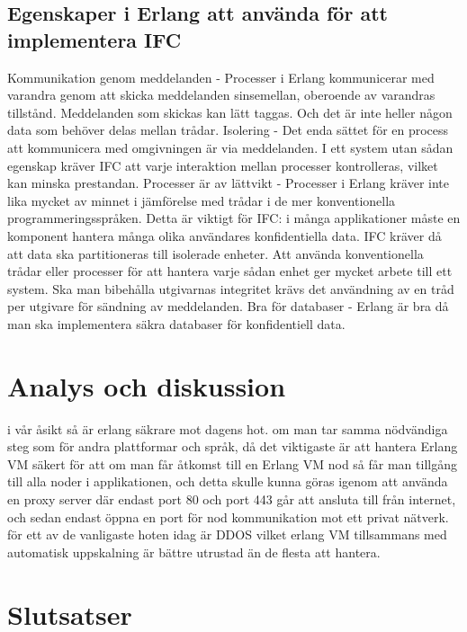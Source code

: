 \documentclass[12pt]{article}
\begin{document}
\subsection*{Egenskaper i Erlang att använda för att implementera IFC} 
Kommunikation genom meddelanden - Processer i Erlang kommunicerar med varandra genom att skicka meddelanden sinsemellan, oberoende av varandras tillstånd. Meddelanden som skickas kan lätt taggas. Och det är inte heller någon data som behöver delas mellan trådar. 
Isolering - Det enda sättet för en process att kommunicera med omgivningen är via meddelanden. I ett system utan sådan egenskap kräver IFC att varje interaktion mellan processer kontrolleras, vilket kan minska prestandan. 
Processer är av lättvikt - Processer i Erlang kräver inte lika mycket av minnet i jämförelse med trådar i de mer konventionella programmeringsspråken. Detta är viktigt för IFC: i många applikationer måste en komponent hantera många olika användares konfidentiella data. IFC kräver då att data ska partitioneras till isolerade enheter. Att använda konventionella trådar eller processer för att hantera varje sådan enhet ger mycket arbete till ett system. Ska man bibehålla utgivarnas integritet krävs det användning av en tråd per utgivare för sändning av meddelanden. \cite{IFC}
Bra för databaser - Erlang är bra då man ska implementera säkra databaser för konfidentiell data. \cite{database}




	


\section{	Analys och diskussion}


i vår åsikt så är erlang säkrare mot dagens hot. om man tar samma nödvändiga steg som för andra plattformar och språk, då det viktigaste är att hantera Erlang VM säkert för att om man får åtkomst till en Erlang VM nod så får man tillgång till alla noder i applikationen, och detta skulle kunna göras igenom att använda en proxy \cite{101} server där endast port 80 och port 443 går att ansluta till från internet, och sedan endast öppna en port för nod kommunikation mot ett privat nätverk. för ett av de vanligaste hoten idag är DDOS vilket erlang VM tillsammans med automatisk uppskalning är bättre utrustad än de flesta att hantera.

	
\section{Slutsatser}
\end{document}
